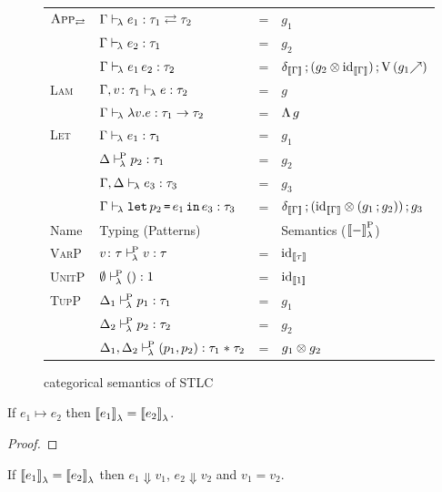 \documentclass[runningheads,envcountsame]{llncs}
\begin{document}
\begin{figure}
{\begin{tabular}{l|l c l}
        \\ \hline
          \multirow{3}{*}{$\textsc{App}_{{\rightleftarrows}}$}
        & $\Gamma \vdash_{\!\lambda} e_1 : \tau_1 \mathrel{{\rightleftarrows}} \tau_2$
        & = & $g_1$ \\
        & $\Gamma \vdash_{\!\lambda} e_2 : \tau_1$
        & = & $g_2$ \\ \cline{2-2}
        & $\Gamma \vdash_{\!\lambda} e_1\,e_2 : \tau_2$
        & = & $\comp{\comp{\dup_{\sem{\Gamma}}}{(\tensor{g_2}{\id_{\sem{\Gamma}}})}}{\uncurry\,(\f{g_1})}$
        \\ \hline
          \multirow{2}{*}{\textsc{Lam}}
        & $\Gamma, v\colon \tau_1 \vdash_{\!\lambda} e : \tau_2$
        & = & $g$ \\ \cline{2-2}
        & $\typerulel{\Gamma}{\elam{v}{e}}{\tfun{\tau_1}{\tau_2}}$
        & = & $\curry\,g$
        \\ \hline
          \multirow{3}{*}{\textsc{Let}}
        & $\Gamma \vdash_{\!\lambda} e_1 : \tau_1$
        & = & $g_1$ \\
        & $\Delta \vdash^{\!\mathrm{P}}_{\!\lambda} p_2 : \tau_1$
        & = & $g_2$ \\
        & $\Gamma,\Delta \vdash_{\!\lambda} e_3 : \tau_3$
        & = & $g_3$ \\ \cline{2-2}
        & $\Gamma \vdash_{\!\lambda} \texttt{let}\,p_2\,\texttt{=}\,e_1\,\texttt{in}\,e_3 : \tau_3$
        & = & $\comp{\comp{\dup_{\sem{\Gamma}}}{(\tensor{\id_{\sem{\Gamma}}}{(\comp{g_1}{g_2})})}}{g_3}$
        \\ \hline \hline
        Name & Typing (Patterns) & & Semantics ($\semLP{-}$) \\ \hline
          \textsc{VarP}
        & $v\colon \tau \vdash^{\!\mathrm{P}}_{\!\lambda} v : \tau$
        & = & $\id_{\sem{\tau}}$ 
        \\ \hline
          \textsc{UnitP}
        & $\emptyset \vdash^{\!\mathrm{P}}_{\!\lambda} () : 1$
        & = & $\id_{\sem{\tunit}}$ 
        \\ \hline
          \multirow{3}{*}{\textsc{TupP}}
        & $\Delta_1 \vdash^{\!\mathrm{P}}_{\!\lambda} p_1 : \tau_1$
        & = & $g_1$ \\
        & $\Delta_2 \vdash^{\!\mathrm{P}}_{\!\lambda} p_2 : \tau_2$
        & = & $g_2$ \\ \cline{2-2}
        & $\Delta_1, \Delta_2 \vdash^{\!\mathrm{P}}_{\!\lambda} (p_1, p_2) : \tau_1 \mathrel{*} \tau_2$
        & = & $\tensor{g_1}{g_2}$ 
        \\ \hline
    \end{tabular}}
    \caption{categorical semantics of STLC}
    \label{fig:semantics1}
\end{figure}

\begin{lemma}
    If $e_1 \mapsto e_2$ then $\semL{e_1} = \semL{e_2}$.
\end{lemma}
\begin{proof}
    
\end{proof}
\begin{lemma}
    If $\semL{e_1} = \semL{e_2}$ then $e_1 \Downarrow v_1$, $e_2 \Downarrow v_2$ and $v_1 = v_2$.
\end{lemma}
\end{document}
